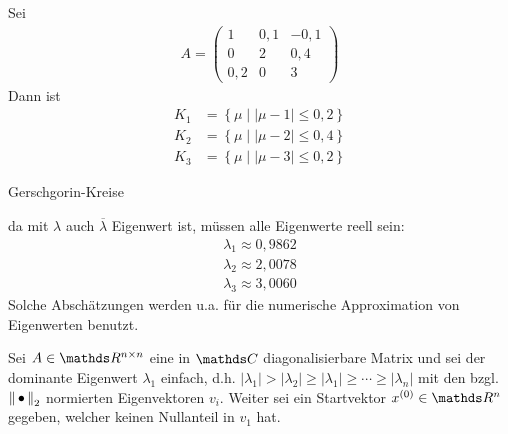 \begin{Bspe}
  Sei 
  \begin{gather*}
    A=
    \begin{pmatrix}
      1 & 0,1 & -0,1\\
      0 & 2 & 0,4 \\
      0,2 & 0 & 3
    \end{pmatrix}
  \end{gather*}
  Dann ist
  \begin{align*}
    K_1 &= \left\{ \mu \mid |\mu-1|\leq 0,2 \right\} \\
    K_2 &= \left\{ \mu \mid |\mu-2|\leq 0,4 \right\} \\
    K_3 &= \left\{ \mu \mid |\mu-3|\leq 0,2 \right\}
  \end{align*}
  \begin{image}{Gerschgorin-Kreise}
  \end{image}\label{im8.1.3}
  da mit $\lambda$ auch $\overline{\lambda}$ Eigenwert ist,
  müssen alle Eigenwerte reell sein:
  \begin{align*}
    \lambda_1 \approx 0,9862 \\
    \lambda_2 \approx 2,0078 \\
    \lambda_3 \approx 3,0060
  \end{align*}
  Solche Abschätzungen werden u.a. für die numerische
  Approximation von Eigenwerten benutzt.
\end{Bspe}


\label{8.2.1}
Sei $A\in\R^{n\times n}$ eine  in $\C$
diagonalisierbare Matrix und 
sei der dominante Eigenwert $\lambda_1$ einfach,
d.h. 
$|\lambda_1|>|\lambda_2|\geq |\lambda_1|\geq\dotsb\geq |\lambda_n|$
mit den bzgl. $\left\| \,\bullet\, \right\|_2$ normierten Eigenvektoren $v_i$.
Weiter sei ein Startvektor $x^{(0)}\in\R^n$ gegeben,
welcher keinen Nullanteil in $v_1$ hat.

